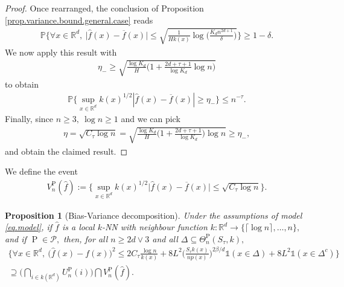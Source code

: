 \documentclass[10pt]{article}
\newcommand{\mP}{\mathcal{P}}
\newcommand{\PP}{\mathbb{P}}
\newcommand{\RR}{\mathbb{R}}
\renewcommand{\P}{\operatorname{P}}
\newcommand{\wh}{\widehat}
\newcommand{\ol}{\overline}
\newtheorem{proposition}[theorem]{Proposition}
\begin{document}
\begin{proof}
    Once rearranged, the conclusion of Proposition \ref{prop.variance.bound.general.case} reads
    \begin{align*}
        \PP\Bigg\{\forall x\in\RR^d, \ \big|\wh f(x) - \ol f(x)\big| \leq \sqrt{\frac{1}{Hk(x)}\log\Big(\frac{K_dn^{2d + 1}}{\delta}\Big)}\Bigg\} \geq 1 - \delta.
    \end{align*}
    We now apply this result with 
    \begin{align*}
        \eta_- \geq \sqrt{\frac{\log K_d}H\bigg(1 + \frac{2d + \tau + 1}{\log K_d}\log n\bigg)}
    \end{align*}
    to obtain
    \begin{align*}
        \PP\Bigg\{\sup_{x \in \RR^d}k(x)^{1/2}|\wh f(x) - \ol f(x)| \geq \eta_-\Bigg\} \leq n^{-\tau}.
    \end{align*}
    Finally, since $n\geq 3, \ \log n \geq 1$ and we can pick
    \begin{align*}
        \eta = \sqrt{C_\tau\log n} = \sqrt{\frac{\log K_d}{H}\bigg(1 + \frac{2d + \tau + 1}{\log K_d}\bigg)\log n} \geq \eta_-,
    \end{align*}
    and obtain the claimed result.
\end{proof}
We define the event
\begin{align*}
    V_n^{\P}(\wh f) := \Bigg\{\sup_{x \in \RR^d}k(x)^{1/2}\big|\wh f(x) - \ol f(x)\big| \leq \sqrt{C_\tau\log n}\Bigg\}.
\end{align*}




\begin{proposition}[Bias-Variance decomposition]
    \label{prop.decomp.knn}
    Under the assumptions of model \eqref{eq.model}, if $\wh f$ is a local $k$-NN with neighbour function $k\colon \RR^d \to \{\lceil \log n\rceil, \dots, n\},$ and if $\P \in \mP,$ then, for all $n \geq 2d \vee 3$ and all $\Delta \subseteq \Theta_n^{\P}(S_\tau, k),$
    \begin{multline*}
        \Bigg\{\forall x \in \RR^d,\ \big(\wh f(x) - f(x)\big)^2 \leq 2C_\tau\frac{\log n}{k(x)} + 8L^2\bigg(\frac{S_\tau k(x)}{np(x)}\bigg)^{2\beta/d}\mathds{1}(x \in \Delta) + 8L^2\mathds{1}(x \in \Delta^c)\Bigg\}\\
        \supseteq \bigg(\bigcap_{i \in k(\RR^d)}U_n^{\P}(i)\bigg)\bigcap V_n^{\P}(\wh f).
    \end{multline*}
\end{proposition}
\end{document}
